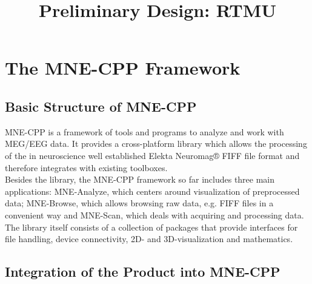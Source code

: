 




	
\title{Preliminary Design: RTMU}
\vspace{3 in}
\maketitle
\clearpage

\tableofcontents

\clearpage
\section{The MNE-CPP Framework}

\subsection{Basic Structure of MNE-CPP}

MNE-CPP is a framework of tools and programs to analyze and work with MEG/EEG data.
It provides a cross-platform library which allows the processing of the in neuroscience well established Elekta Neuromag® FIFF file format and therefore integrates with existing toolboxes. \\
Besides the library, the MNE-CPP framework so far includes three main applications: MNE-Analyze, which centers around visualization of preprocessed data; MNE-Browse, which allows browsing raw data, e.g. FIFF files in a convenient way and MNE-Scan, which deals with acquiring and processing data. \\
The library itself consists of a collection of packages that provide interfaces for file handling, device connectivity, 2D- and 3D-visualization and mathematics.

\subsection{Integration of the Product into MNE-CPP}

